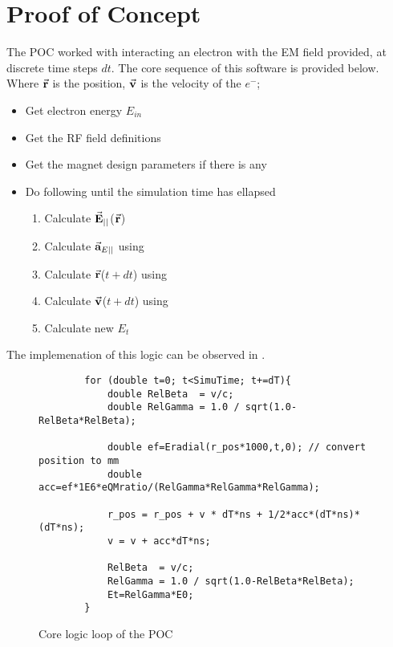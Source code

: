 \documentclass{article}
\begin{document}
\section{Proof of Concept}
The POC worked with interacting an electron with the EM field provided, at discrete time steps $dt$. The core sequence of this software is provided below.
Where $\vec{\textbf{r}}$ is the position, $\vec{\textbf{v}}$ is the velocity of the $e^-$;
\begin{itemize}
    \item Get electron energy $E_{in}$
    \item Get the RF field definitions
    \item Get the magnet design parameters if there is any
    \item Do following until the simulation time has ellapsed
    \begin{enumerate}
        \item Calculate $\vec{\textbf{E}}_{||}$($\vec{\textbf{r}}$)
        \item Calculate $\vec{\textbf{a}}_{E ||}$ using 
        \item Calculate $\vec{\textbf{r}}$($t+dt$) using 
        \item Calculate $\vec{\textbf{v}}$($t+dt$) using 
        \item Calculate new $E_t$
    \end{enumerate}
\end{itemize}
The implemenation of this logic can be observed in . 
\begin{figure}[H]
    \begin{verbatim}
        for (double t=0; t<SimuTime; t+=dT){
            double RelBeta  = v/c;
            double RelGamma = 1.0 / sqrt(1.0-RelBeta*RelBeta);
        
            double ef=Eradial(r_pos*1000,t,0); // convert position to mm
            double acc=ef*1E6*eQMratio/(RelGamma*RelGamma*RelGamma); 
        
            r_pos = r_pos + v * dT*ns + 1/2*acc*(dT*ns)*(dT*ns);
            v = v + acc*dT*ns;

            RelBeta  = v/c;
            RelGamma = 1.0 / sqrt(1.0-RelBeta*RelBeta);
            Et=RelGamma*E0; 
        }
    \end{verbatim}
    \caption{Core logic loop of the POC}
    \label{fig:POC_core_logic}
\end{figure}
\end{document}
